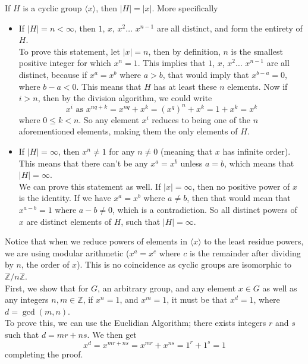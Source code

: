 \documentclass[12pt]{article}
\newcommand{\Z}{\mathbb{Z}}
\newcommand{\ang}[1]{\langle #1 \rangle}
\begin{document}
    If $H$ is a cyclic group $\ang{x}$,
    then $|H| = |x|$.
    More specifically
    \begin{itemize}[label=$\diamond$]
        \item 
            If $|H| = n < \infty$,
            then $1$, $x$, $x^2 \dots$ $x^{n-1}$ are all distinct,
            and form the entirety of $H$. \\
            To prove this statement,
            let $|x| = n$, then by definition,
            $n$ is the smallest positive integer for which $x^n = 1$.
            This implies that $1$, $x$, $x^2 \dots$ $x^{n-1}$
            are all distinct, because if $x^a = x^b$ where $a > b$,
            that would imply that $x^{b-a} = 0$,
            where $b-a < 0$. 
            This means that $H$ has at least these $n$ elements.
            Now if $i > n$, then by the division algorithm,
            we could write
            \[ x^i \text{ as } x^{nq + k} = x^{nq} + x^k = (x^q)^{n} + x^k 
            = 1 + x^k = x^k \]
            where $0 \leqslant k < n$.
            So any element $x^i$ reduces to being one of the $n$
            aforementioned elements, making them the only elements of $H$.
        \item 
            If $|H| = \infty$,
            then $x^n \neq 1$ for any $n \neq 0$
            (meaning that $x$ has infinite order).
            This means that there can't be any $x^a = x^b$
            unless $a = b$,
            which means that $|H| = \infty$. \\
            We can prove this statement as well.
            If $|x| = \infty$,
            then no positive power of $x$ is the identity.
            If we have $x^a = x^b$ where $a \neq b$,
            then that would mean that $x^{a-b} = 1$ where $a-b \neq 0$,
            which is a contradiction.
            So all distinct powers of $x$ are distinct elements of $H$,
            such that $|H| = \infty$.
    \end{itemize}
    
    Notice that when we reduce powers of elements in $\ang{x}$
    to the least residue powers, we are using modular arithmetic
    ($x^a = x^c$ where $c$ is the remainder after dividing by $n$,
    the order of $x$).
    This is no coincidence as
    cyclic groups are isomorphic to $\Z/n\Z$. \\

    First, we show that for $G$, an arbitrary group,
    and any element $x \in G$ as well as any integers $n, m \in \Z$,
    if $x^n = 1$,
    and $x^m = 1$,
    it must be that $x^d = 1$,
    where $d = \gcd(m, n)$. \\ 
    To prove this, we can use the Euclidian Algorithm;
    there exists integers $r$ and $s$ such that $d = mr + ns$.
    We then get
    \[ x^d = x^{mr + ns} = x^{mr} + x^{ns} = 1^r + 1^s = 1 \]
    completing the proof. \\
\end{document}
